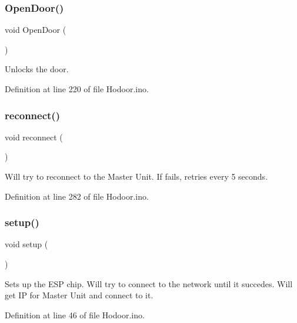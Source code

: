 \mbox{\label{_hodoor_8ino_a6eba9e4464d54ec1dad2519781313b12}} 
\subsubsection{\texorpdfstring{Open\+Door()}{OpenDoor()}}
{\footnotesize\ttfamily void Open\+Door (\begin{DoxyParamCaption}{ }\end{DoxyParamCaption})}



Unlocks the door. 



Definition at line 220 of file Hodoor.\+ino.

\mbox{\label{_hodoor_8ino_a4bcd6ce7d04c38f8c4ff908d1fc50f86}} 
\subsubsection{\texorpdfstring{reconnect()}{reconnect()}}
{\footnotesize\ttfamily void reconnect (\begin{DoxyParamCaption}{ }\end{DoxyParamCaption})}

Will try to reconnect to the Master Unit. If fails, retries every 5 seconds. 

Definition at line 282 of file Hodoor.\+ino.

\mbox{\label{_hodoor_8ino_a4fc01d736fe50cf5b977f755b675f11d}} 
\subsubsection{\texorpdfstring{setup()}{setup()}}
{\footnotesize\ttfamily void setup (\begin{DoxyParamCaption}{ }\end{DoxyParamCaption})}

Sets up the E\+SP chip. Will try to connect to the network until it succedes. Will get IP for Master Unit and connect to it. 

Definition at line 46 of file Hodoor.\+ino.

